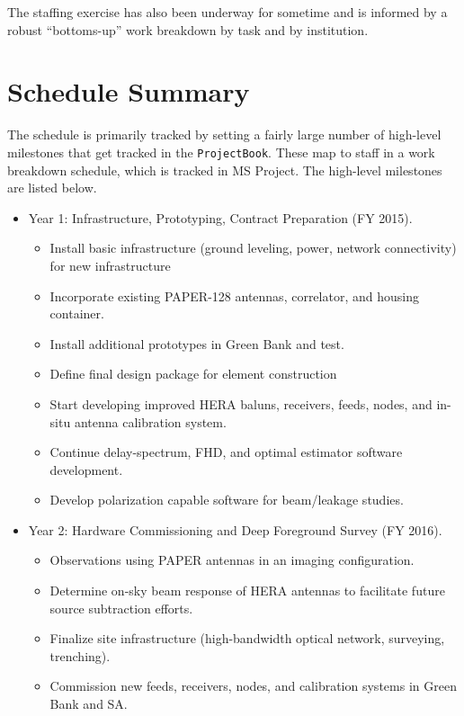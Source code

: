 \documentclass[preprint]{aastex}
\begin{document}
The staffing exercise has also been underway for sometime and is informed by a robust
``bottoms-up'' work breakdown by task and by institution.



\section{Schedule Summary}
\label{sec:schedule}
The schedule is primarily tracked by setting a fairly large number of high-level
milestones that get tracked in the {\tt ProjectBook}. These map to staff in a work
breakdown schedule, which is tracked in MS Project. The high-level milestones are
listed below.

\begin{itemize}[itemsep=-4pt,parsep=-3pt]
\item Year 1:  Infrastructure, Prototyping, Contract Preparation (FY 2015).
\begin{itemize}[itemsep=-4pt]
\item Install basic infrastructure (ground leveling, power, network connectivity) for new infrastructure
\item Incorporate existing PAPER-128 antennas, correlator, and housing container. 
\item Install additional prototypes in Green Bank and test.
\item Define final design package for element construction
\item Start developing improved HERA baluns, receivers, feeds, nodes, and in-situ antenna calibration system. 
\item Continue delay-spectrum, FHD, and optimal estimator software development.
\item Develop polarization capable software for beam/leakage studies.
\end{itemize}
\item Year 2:  Hardware Commissioning and Deep Foreground Survey (FY 2016). 
\begin{itemize}[itemsep=-4pt]
\item Observations using PAPER antennas in an imaging configuration. 
\item Determine on-sky beam response of HERA antennas to facilitate future source subtraction efforts. 
\item Finalize site infrastructure (high-bandwidth optical network, surveying, trenching). 
\item Commission new feeds, receivers, nodes, and calibration systems in Green Bank and SA. 

\end{itemize}
\end{itemize}
\end{document}
